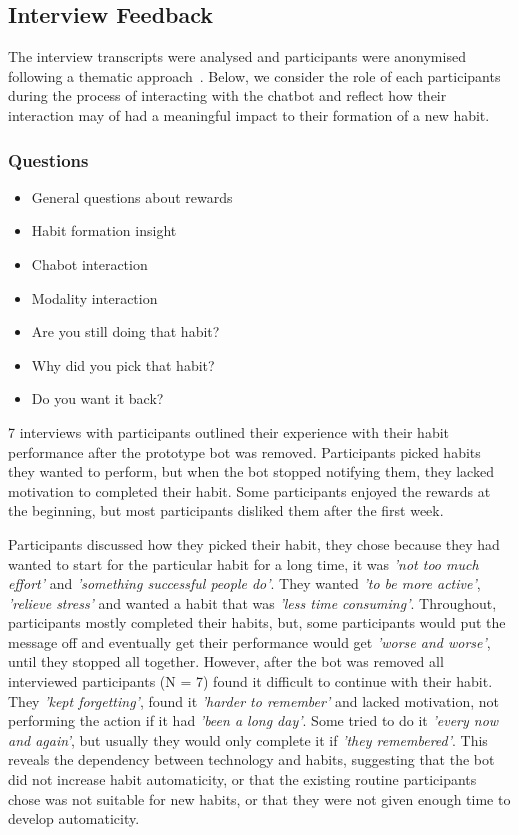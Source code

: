 \subsection{Interview Feedback}

The interview transcripts were analysed and participants were anonymised following a thematic approach~\cite{thematic_analysis_qualatitive_data}. Below, we consider the role of each participants during the process of interacting with the chatbot and reflect how their interaction may of had a meaningful impact to their formation of a new habit.

\subsubsection*{Questions}

\begin{itemize}
  \item General questions about rewards
  \item Habit formation insight
  \item Chabot interaction
  \item Modality interaction
  \item Are you still doing that habit?
  \item Why did you pick that habit?
  \item Do you want it back?
\end{itemize}


7 interviews with participants outlined their experience with their habit performance after the prototype bot was removed. Participants picked habits they wanted to perform, but when the bot stopped notifying them, they lacked motivation to completed their habit. Some participants enjoyed the rewards at the beginning, but most participants disliked them after the first week.

Participants discussed how they picked their habit, they chose because they had wanted to start for the particular habit for a long time, it was \textit{'not too much effort'} and \textit{'something successful people do'}. They wanted \textit{'to be more active'}, \textit{'relieve stress'} and wanted a habit that was \textit{'less time consuming'}. Throughout, participants mostly completed their habits, but, some participants would put the message off and eventually get their performance would get \textit{'worse and worse'}, until they stopped all together. However, after the bot was removed all interviewed participants (N = 7) found it difficult to continue with their habit. They \textit{'kept forgetting'}, found it \textit{'harder to remember'} and lacked motivation, not performing the action if it had \textit{'been a long day'}. Some tried to do it \textit{'every now and again'}, but usually they would only complete it if \textit{'they remembered'}. This reveals the dependency between technology and habits, suggesting that the bot did not increase habit automaticity, or that the existing routine participants chose was not suitable for new habits, or that they were not given enough time to develop automaticity.


